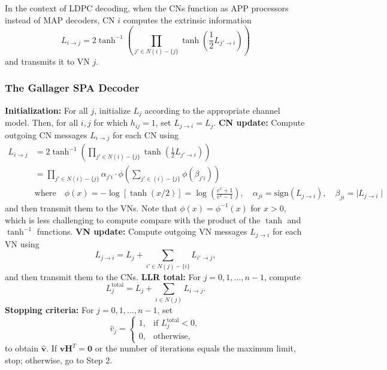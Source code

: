 \documentclass[11pt]{article}
\begin{document}
In the context of LDPC decoding, when the CNs function as APP processors instead of MAP decoders, CN $i$ computes the extrinsic information
\[
\boxed{
L_{i \to j} = 2\tanh^{-1}\left(\prod_{j' \in N(i)-\{j\}} \tanh\left(\frac{1}{2}L_{j' \to i}\right)\right)
}
\]
and transmits it to VN $j$. 

\subsubsection{The Gallager SPA Decoder}

\begin{algorithm}[H]
\caption{The Gallager Sum-Product Algorithm}
\begin{algorithmic}[1]
\State \textbf{Initialization:} For all $j$, initialize $L_j$ according to the appropriate channel model. Then, for all $i,j$ for which $h_{ij} = 1$, set $L_{j \to i} = L_j$.
\State \textbf{CN update:} Compute outgoing CN messages $L_{i \to j}$ for each CN using
  \[
  \begin{aligned}
  L_{i \to j} &= 2\tanh^{-1}\left(\prod_{j' \in N(i)-\{j\}} \tanh\left(\frac{1}{2}L_{j' \to i}\right)\right) \\
  &= \prod_{j' \in N(i)-\{j\}} \alpha_{j'i} \cdot \phi\left( \sum_{j' \in (i)-\{j\}} \phi(\beta_{j'i}) \right) \\
  & \text{where}\quad \phi(x) =-\log [\tanh (x/2)] = \log(\frac{e^x + 1}{e^x - 1}),\quad \alpha_{ji} = \text{sign}(L_{j \to i}),\quad \beta_{ji} = \mid L_{j \to i} \mid
  \end{aligned}
  \]
  and then transmit them to the VNs. Note that $\phi (x) = \phi ^ {-1}(x)$ for $x > 0$, which is less challenging to compute compare with the product of the $\tanh$ and $\tanh^{-1}$ functions.
\State \textbf{VN update:} Compute outgoing VN messages $L_{j \to i}$ for each VN using
  \[
  L_{j \to i} = L_j + \sum_{i' \in N(j)-\{i\}} L_{i' \to j},
  \]
  and then transmit them to the CNs.
\State \textbf{LLR total:} For $j = 0,1,\ldots,n-1$, compute
  \[
  L_j^{\text{total}} = L_j + \sum_{i \in N(j)} L_{i \to j}.
  \]
\State \textbf{Stopping criteria:} For $j = 0,1,\ldots,n-1$, set
  \[
  \hat{v}_j =
  \begin{cases}
  1, & \text{if } L_j^{\text{total}} < 0, \\
  0, & \text{otherwise,}
  \end{cases}
  \]
  to obtain $\hat{\mathbf{v}}$. If $\hat{\mathbf{v}}\mathbf{H}^{T} = \mathbf{0}$ or the number of iterations equals the maximum limit, stop; otherwise, go to Step 2.
\end{algorithmic}
\end{algorithm}
\end{document}
